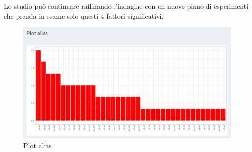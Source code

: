 \documentclass[
  11pt,
]{book}
\begin{document}
Lo studio può continuare raffinando l'indagine con un nuovo piano di esperimenti che prenda in esame solo questi 4 fattori significativi.

\begin{figure}[ht]

{\centering \includegraphics[width=1\linewidth]{Immagini/PB/04_plot_alias} 

}

\caption{Plot alias}\label{fig:pb4}
\end{figure}

\backmatter

  

\end{document}
